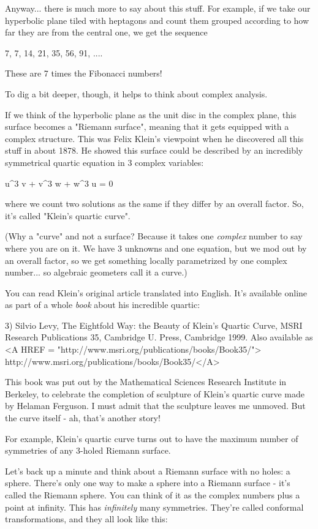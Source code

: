 Anyway... there is much more to say about this stuff.  For example, 
if we take our hyperbolic plane tiled with heptagons and count them 
grouped according to how far they are from the central one, we get 
the sequence

7, 7, 14, 21, 35, 56, 91, ....

These are 7 times the Fibonacci numbers!

To dig a bit deeper, though, it helps to think about complex analysis.

If we think of the hyperbolic plane as the unit disc in the complex 
plane, this surface becomes a "Riemann surface", meaning that it
gets equipped with a complex structure.  This was Felix Klein's
viewpoint when he discovered all this stuff in about 1878.  He 
showed this surface could be described by an incredibly symmetrical 
quartic equation in 3 complex variables:

u^{3} v + v^{3} w + w^{3} u = 0

where we count two solutions as the same if they differ by an overall 
factor.  So, it's called "Klein's quartic curve".  

(Why a "curve" and not a surface?  Because it takes one 
\emph{complex}
number to say where you are on it.  We have 3 unknowns and one 
equation, but we mod out by an overall factor, so we get something
locally parametrized by one complex number... so algebraic geometers
call it a curve.)

You can read Klein's original article translated into English.  
It's available online as part of a whole \emph{book} about his incredible 
quartic: 

3) Silvio Levy, The Eightfold Way: the Beauty of Klein's Quartic Curve,
MSRI Research Publications 35, Cambridge U. Press, Cambridge 1999.
Also available as <A HREF = "http://www.msri.org/publications/books/Book35/">
http://www.msri.org/publications/books/Book35/</A>

This book was put out by the Mathematical Sciences Research Institute 
in Berkeley, to celebrate the completion of sculpture of Klein's
quartic curve made by Helaman Ferguson.  I must admit that the 
sculpture leaves me unmoved.  But the curve itself - ah, that's 
another story!

For example, Klein's quartic curve turns out to have the maximum 
number of symmetries of any 3-holed Riemann surface. 

Let's back up a minute and think about a Riemann surface with no holes:
a sphere.  There's only one way to make a sphere into a Riemann 
surface - it's called the Riemann sphere.  You can think of it as
the complex numbers plus a point at infinity.  This has \emph{infinitely}
many symmetries.  They're called conformal transformations, and they
all look like this:

